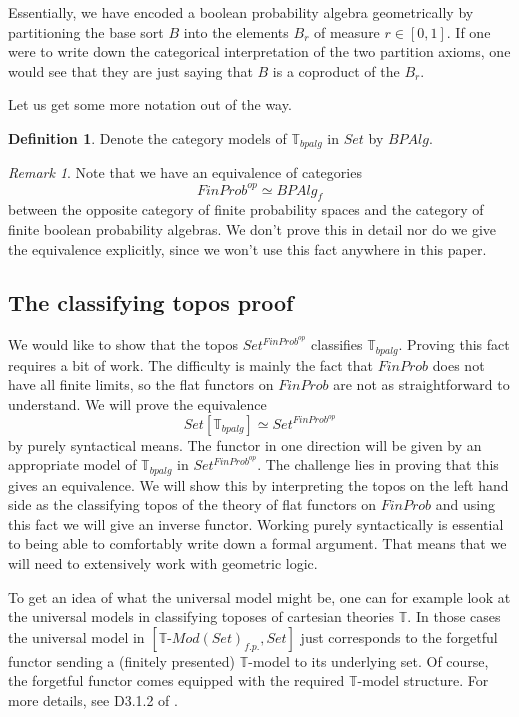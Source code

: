 \documentclass[a4paper]{amsproc}
\theoremstyle{plain}
\theoremstyle{definition}
\newtheorem{definition}[theorem]{Definition}
\theoremstyle{remark}
\newtheorem{remark}[theorem]{Remark}
\numberwithin{equation}{section}
\begin{document}
Essentially, we have encoded a boolean probability algebra geometrically by partitioning the base sort $B$ into the elements $B_r$ of measure $r \in [0,1]$. If one were to write down the categorical interpretation of the two partition axioms, one would see that they are just saying that $B$ is a coproduct of the $B_r$.

Let us get some more notation out of the way.

\begin{definition}
Denote the category models of $\mathbb{T}_{bpalg}$ in $Set$ by $BPAlg$.
\end{definition}

\begin{remark}
    Note that we have an equivalence of categories 
    \[
        FinProb^{op} \simeq BPAlg_f
    \]
    between the opposite category of finite probability spaces and the category of finite boolean probability algebras. We don't prove this in detail nor do we give the equivalence explicitly, since we won't use this fact anywhere in this paper.

\end{remark}

\subsection{The classifying topos proof}

We would like to show that the topos $Set^{FinProb^{op}}$ classifies $\mathbb{T}_{bpalg}$. Proving this fact requires a bit of work. The difficulty is mainly the fact that  $FinProb$ does not have all finite limits, so the flat functors on $FinProb$ are not as straightforward to understand. We will prove the equivalence
\[
Set[\mathbb{T}_{bpalg}] \simeq Set^{FinProb^{op}}
\]
by purely syntactical means. The functor in one direction will be given by an appropriate model of $\mathbb{T}_{bpalg}$ in $Set^{FinProb^{op}}$. The challenge lies in proving that this gives an equivalence. We will show this by interpreting the topos on the left hand side as the classifying topos of the theory of flat functors on $FinProb$ and using this fact we will give an inverse functor. Working purely syntactically is essential to being able to comfortably write down a formal argument. That means that we will need to extensively work with geometric logic.

To get an idea of what the universal model might be, one can for example look at the universal models in classifying toposes of cartesian theories $\mathbb{T}$. In those cases the universal model in $[\mathbb{T} \text{-} Mod(Set)_{f.p.}, Set]$ just corresponds to the forgetful functor sending a (finitely presented) $\mathbb{T}$-model to its underlying set. Of course, the forgetful functor comes equipped with the required $\mathbb{T}$-model structure. For more details, see D3.1.2 of \cite{elephant}.
\end{document}
